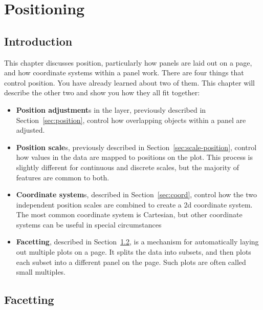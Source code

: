 
% 


\chapter{Positioning}
\label{cha:position}

\section{Introduction}

This chapter discusses position, particularly how panels are laid out on a page, and how coordinate systems within a panel work.  There are four things that control position.  You have already learned about two of them.  This chapter will describe the other two and show you how they all fit together:

\begin{itemize}
  \item {\bf Position adjustment}s in the layer, previously described in Section~\ref{sec:position}, control how overlapping objects within a panel are adjusted.

  \item {\bf Position scale}s, previously described in Section~\ref{sec:scale-position}, control how values in the data are mapped to positions on the plot.  This process is slightly different for continuous and discrete scales, but the majority of features are common to both.

  \item {\bf Coordinate system}s, described in Section~\ref{sec:coord}, control how the two independent position scales are combined to create a 2d coordinate system.  The most common coordinate system is Cartesian, but other coordinate systems can be useful in special circumstances

  \item {\bf Facetting}, described in Section~\ref{sec:facetting}, is a mechanism for automatically laying out multiple plots on a page.  It splits the data into subsets, and then plots each subset into a different panel on the page.  Such plots are often called small multiples.  
  
\end{itemize}

\section{Facetting}
\label{sec:facetting}

